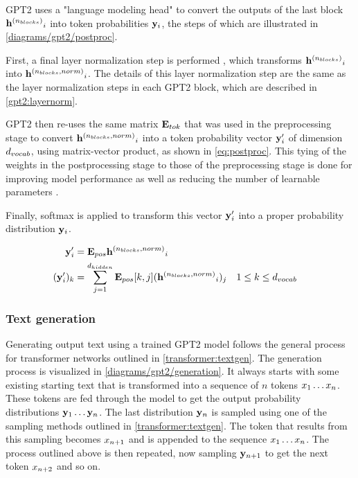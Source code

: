 GPT2 uses a "language modeling head" \cite{HuggingFaceGPT2} to convert the outputs of the last block ${\mathbf{h}^{({n_{blocks}})}}_i$ into token probabilities ${\mathbf{y}}_i$, the steps of which are illustrated in \cref{diagrams/gpt2/postproc}.

First, a final layer normalization step is performed , which transforms ${\mathbf{h}^{({n_{blocks}})}}_i$ into ${\mathbf{h}^{({n_{blocks}}, norm)}}_i$. The details of this layer normalization step are  the same as the layer normalization steps in each GPT2 block, which are described in \cref{gpt2:layernorm}.

GPT2 then re-uses the same matrix ${\mathbf{E}_{tok}}$ that was used in the preprocessing stage to convert ${\mathbf{h}^{({n_{blocks}}, norm)}}_i$ into a token probability vector ${\mathbf{y}}'_i$ of dimension ${d_{vocab}}$, using matrix-vector product, as shown in \cref{eq:postproc}.
This tying of the weights in the postprocessing stage to those of the preprocessing stage is done for improving model performance as well as reducing the number of learnable parameters \cite{weightstying}.

Finally, softmax is applied to transform this vector ${\mathbf{y}}'_i$ into a proper probability distribution ${\mathbf{y}}_i$.

\begin{equation}
	\begin{aligned}
		{\mathbf{y}}'_i &= {\mathbf{E}_{pos}} {\mathbf{h}^{({n_{blocks}}, norm)}}_i \\
		({\mathbf{y}}'_i)_k &= \sum_{j=1}^{{d_{hidden}}}{{{\mathbf{E}_{pos}}[k,j]} ({\mathbf{h}^{({n_{blocks}}, norm)}}_i)_j} && 1 \leq k \leq {d_{vocab}}
	\end{aligned}
	\label{eq:postproc}
\end{equation}



\subsubsection{Text generation}
\label{gpt2:textgen}

Generating output text using a trained GPT2 model follows the general process for transformer networks outlined in \cref{transformer:textgen}.
The generation process is visualized in \cref{diagrams/gpt2/generation}. It always starts with some existing starting text that is transformed into a sequence of $n$ tokens ${x}_1 \ldots {x}_n$. These tokens are fed through the model to get the output probability distributions ${\mathbf{y}}_1 \ldots {\mathbf{y}}_n$. The last distribution ${\mathbf{y}}_n$ is sampled using one of the sampling methods outlined in \cref{transformer:textgen}. The token that results from this sampling becomes ${x}_{n+1}$ and is appended to the sequence ${x}_1 \ldots {x}_n$. The process outlined above is then repeated, now sampling ${\mathbf{y}}_{n+1}$ to get the next token ${x}_{n+2}$ and so on.


